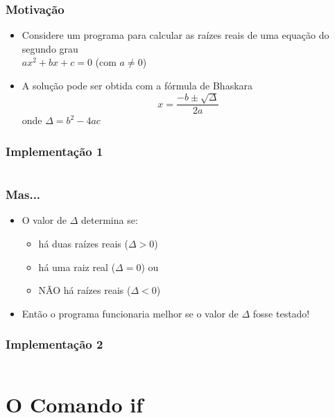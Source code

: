 \documentclass[xcolor={dvipsnames,table},aspectratio=169]{beamer}
\begin{document}
\begin{frame}\frametitle{Motivação}
\begin{itemize}
	\item Considere um programa para calcular as raízes reais de uma equação do segundo grau\\$ax^2 + bx + c = 0$ (com $a\neq 0$)
	\item A solução pode ser obtida com a fórmula de Bhaskara
\[x=\frac{-b\pm\sqrt{\Delta}}{2a}\]
onde $\Delta = b^2-4ac$
\end{itemize}
\end{frame}
	
\begin{frame}[fragile]\frametitle{Implementação 1}
\pause
\tiny{
\inputminted[bgcolor=cyan!10]{java}{src/Bhaskara.java}
}
\end{frame}
	
\begin{frame}\frametitle{Mas...}
\begin{itemize}
	\item O valor de $\Delta$ determina se:
	\begin{itemize}
		\item há duas raízes reais ($\Delta > 0$)
		\item há uma raiz real ($\Delta = 0$) ou
		\item NÃO há raízes reais ($\Delta < 0$)
	\end{itemize}
	\item Então o programa funcionaria melhor se o valor de $\Delta$ fosse testado!
\end{itemize}
\end{frame}
	
\begin{frame}[fragile]\frametitle{Implementação 2}
\pause
\tiny{
\inputminted[bgcolor=cyan!10]{java}{src/Bhaskara2.java}
}
\end{frame}
	
\section{O Comando if}
\end{document}
